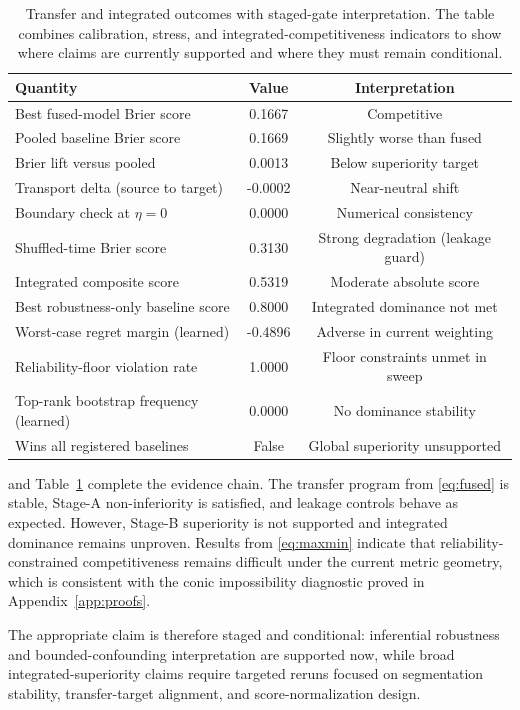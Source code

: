 \documentclass{article} %
\begin{document}
\begin{table}[t]
\caption{Transfer and integrated outcomes with staged-gate interpretation. The table combines calibration, stress, and integrated-competitiveness indicators to show where claims are currently supported and where they must remain conditional.}
\label{tab:h4p4}
\centering
\small
\renewcommand{\arraystretch}{1.1}
\setlength{\tabcolsep}{4pt}
\begin{tabular}{lcc}
\hline
Quantity & Value & Interpretation \\
\hline
Best fused-model Brier score & 0.1667 & Competitive \\
Pooled baseline Brier score & 0.1669 & Slightly worse than fused \\
Brier lift versus pooled & 0.0013 & Below superiority target \\
Transport delta (source to target) & -0.0002 & Near-neutral shift \\
Boundary check at $\eta=0$ & 0.0000 & Numerical consistency \\
Shuffled-time Brier score & 0.3130 & Strong degradation (leakage guard) \\
Integrated composite score & 0.5319 & Moderate absolute score \\
Best robustness-only baseline score & 0.8000 & Integrated dominance not met \\
Worst-case regret margin (learned) & -0.4896 & Adverse in current weighting \\
Reliability-floor violation rate & 1.0000 & Floor constraints unmet in sweep \\
Top-rank bootstrap frequency (learned) & 0.0000 & No dominance stability \\
Wins all registered baselines & False & Global superiority unsupported \\
\hline
\end{tabular}
\end{table}

 and Table~\ref{tab:h4p4} complete the evidence chain. The transfer program from \eqref{eq:fused} is stable, Stage-A non-inferiority is satisfied, and leakage controls behave as expected. However, Stage-B superiority is not supported and integrated dominance remains unproven. Results from \eqref{eq:maxmin} indicate that reliability-constrained competitiveness remains difficult under the current metric geometry, which is consistent with the conic impossibility diagnostic proved in Appendix~\ref{app:proofs}.

The appropriate claim is therefore staged and conditional: inferential robustness and bounded-confounding interpretation are supported now, while broad integrated-superiority claims require targeted reruns focused on segmentation stability, transfer-target alignment, and score-normalization design.
\end{document}

